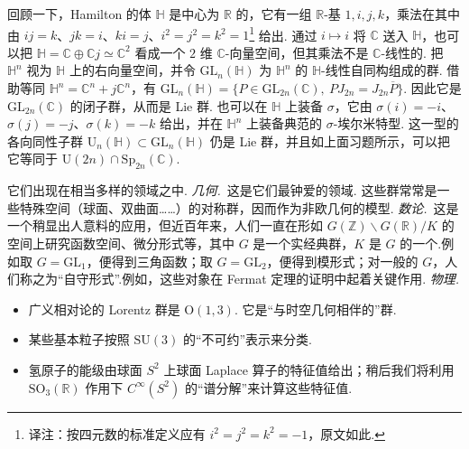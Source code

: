 \begin{numpara}[四元数群]\label{np:lie-1-2-5}
回顾一下，Hamilton 的体 $\mathbb H$ 是中心为 $\mathbb R$ 的，它有一组 $\mathbb R$-基 $1,i,j,k$，乘法在其中由 $ij=k$、$jk=i$、$ki=j$、$i^2=j^2=k^2=1$\footnote{译注：按四元数的标准定义应有 $i^2=j^2=k^2=-1$，原文如此.} 给出. 通过 $i\mapsto i$ 将 $\mathbb C$ 送入 $\mathbb H$，也可以把 $\mathbb H=\mathbb C\oplus\mathbb Cj\simeq\mathbb C^2$ 看成一个 $2$ 维 $\mathbb C$-向量空间，但其乘法不是 $\mathbb C$-线性的.
把 $\mathbb H^n$ 视为 $\mathbb H$ 上的右向量空间，并令 $\mathrm{GL}_n(\mathbb H)$ 为 $\mathbb H^n$ 的 $\mathbb H$-线性自同构组成的群. 借助等同 $\mathbb H^n=\mathbb C^n+j\mathbb C^n$，有 $\mathrm{GL}_n(\mathbb H)=\{P\in\mathrm{GL}_{2n}(\mathbb C),\ PJ_{2n}=J_{2n}\overline{P}\}$. 因此它是 $\mathrm{GL}_{2n}(\mathbb C)$ 的闭子群，从而是 Lie 群.
也可以在 $\mathbb H$ 上装备 $\sigma$，它由 $\sigma(i)=-i$、$\sigma(j)=-j$、$\sigma(k)=-k$ 给出，并在 $\mathbb H^n$ 上装备典范的 $\sigma$-埃尔米特型. 这一型的各向同性子群 $\mathrm{U}_n(\mathbb H)\subset\mathrm{GL}_n(\mathbb H)$ 仍是 Lie 群，并且如上面习题所示，可以把它等同于 $\mathrm{U}(2n)\cap\mathrm{Sp}_{2n}(\mathbb C)$.
\end{numpara}
\begin{numpara}[经典群的重要性]\label{np:lie-1-2-6}
它们出现在相当多样的领域之中.
\textit{几何.}\ 这是它们最钟爱的领域. 这些群常常是一些特殊空间（球面、双曲面……）的对称群，因而作为非欧几何的模型.
\textit{数论.}\ 这是一个稍显出人意料的应用，但近百年来，人们一直在形如 $G(\mathbb Z)\backslash G(\mathbb R)/K$ 的空间上研究函数空间、微分形式等，其中 $G$ 是一个实经典群，$K$ 是 $G$ 的一个.例如取 $G=\mathrm{GL}_1$，便得到三角函数；取 $G=\mathrm{GL}_2$，便得到模形式；对一般的 $G$，人们称之为``自守形式''.例如，这些对象在 Fermat 定理的证明中起着关键作用.
\textit{物理.}
\begin{itemize}
\item 广义相对论的 Lorentz 群是 $\mathrm{O}(1,3)$. 它是``与时空几何相伴的''群.
\item 某些基本粒子按照 $\mathrm{SU}(3)$ 的``不可约''表示来分类.
\item 氢原子的能级由球面 $S^2$ 上球面 Laplace 算子的特征值给出；稍后我们将利用 $\mathrm{SO}_3(\mathbb R)$ 作用下 $C^\infty(S^2)$ 的``谱分解''来计算这些特征值.
\end{itemize}
\end{numpara}

